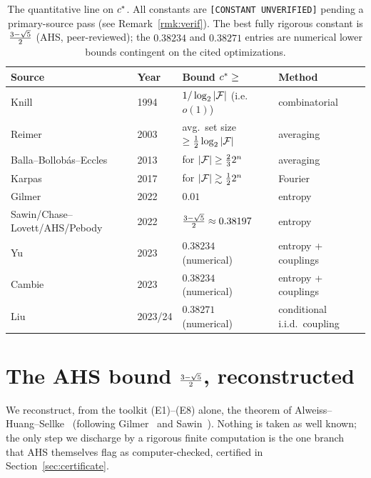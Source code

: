 \documentclass[11pt]{amsart}
\theoremstyle{definition}
\theoremstyle{remark}
\begin{document}
\begin{table}[t]
\centering
\small
\begin{tabular}{@{}llll@{}}
\toprule
Source & Year & Bound $c^{\ast}\ge$ & Method \\
\midrule
Knill~\cite{knill1994} & 1994 & $1/\log_2|\mathcal{F}|$ (i.e.\ $o(1)$) & combinatorial \\
Reimer~\cite{reimer2003} & 2003 & avg.\ set size $\ge\tfrac12\log_2|\mathcal{F}|$ & averaging \\
Balla--Bollob\'as--Eccles~\cite{bbe2013} & 2013 & for $|\mathcal{F}|\ge\tfrac23 2^n$ & averaging \\
Karpas~\cite{karpas2017} & 2017 & for $|\mathcal{F}|\gtrsim\tfrac12 2^n$ & Fourier \\
Gilmer~\cite{gilmer2022} & 2022 & $0.01$ & entropy \\
Sawin/Chase--Lovett/AHS/Pebody & 2022 & $\tfrac{3-\sqrt{5}}{2}\approx 0.38197$ & entropy \\
Yu~\cite{yu2023} & 2023 & $0.38234$ (numerical) & entropy + couplings \\
Cambie~\cite{cambie2023} & 2023 & $0.38234$ (numerical) & entropy + couplings \\
Liu~\cite{liu2023} & 2023/24 & $0.38271$ (numerical) & conditional i.i.d.\ coupling \\
\bottomrule
\end{tabular}
\caption{The quantitative line on $c^{\ast}$. All constants are
\texttt{[CONSTANT UNVERIFIED]} pending a primary-source pass (see
Remark~\ref{rmk:verif}). The best fully rigorous constant is $\tfrac{3-\sqrt{5}}{2}$ (AHS,
peer-reviewed); the $0.38234$ and $0.38271$ entries are numerical lower bounds
contingent on the cited optimizations.}
\label{tab:history}
\end{table}

\section{The AHS bound \texorpdfstring{$\tfrac{3-\sqrt{5}}{2}$}{(3-sqrt5)/2}, reconstructed}
\label{sec:ahs}

We reconstruct, from the toolkit (E1)--(E8) alone, the theorem of
Alweiss--Huang--Sellke~\cite{ahs2023} (following Gilmer~\cite{gilmer2022} and
Sawin~\cite{sawin2022}). Nothing is taken as well known; the only step we
discharge by a rigorous finite computation is the one branch that AHS themselves
flag as computer-checked, certified in Section~\ref{sec:certificate}.
\end{document}
